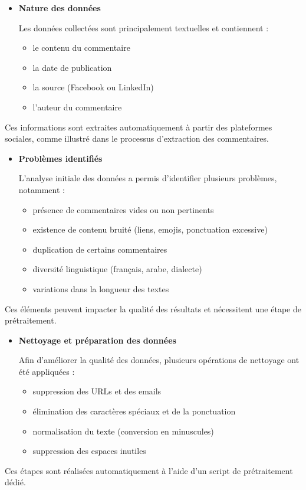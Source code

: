\documentclass[12pt,a4paper,oneside]{report}
\begin{document}
\begin{itemize}
 \item\textbf{Nature des données}

Les données collectées sont principalement textuelles et contiennent :

\begin{itemize}
    \item le contenu du commentaire
    \item la date de publication
    \item la source (Facebook ou LinkedIn)
    \item l’auteur du commentaire
\end{itemize}

\end{itemize}
Ces informations sont extraites automatiquement à partir des plateformes sociales, comme illustré dans le processus d’extraction des commentaires.

\begin{itemize}
    \item \textbf{Problèmes identifiés}

L’analyse initiale des données a permis d’identifier plusieurs problèmes, notamment :

\begin{itemize}
    \item présence de commentaires vides ou non pertinents
    \item existence de contenu bruité (liens, emojis, ponctuation excessive)
    \item duplication de certains commentaires
    \item diversité linguistique (français, arabe, dialecte)
    \item variations dans la longueur des textes
\end{itemize}

\end{itemize}
Ces éléments peuvent impacter la qualité des résultats et nécessitent une étape de prétraitement.

\begin{itemize}
    \item \textbf{Nettoyage et préparation des données}


Afin d’améliorer la qualité des données, plusieurs opérations de nettoyage ont été appliquées :

\begin{itemize}
    \item suppression des URLs et des emails
    \item élimination des caractères spéciaux et de la ponctuation
    \item normalisation du texte (conversion en minuscules)
    \item suppression des espaces inutiles
\end{itemize}

\end{itemize}
Ces étapes sont réalisées automatiquement à l’aide d’un script de prétraitement dédié.
\end{document}
